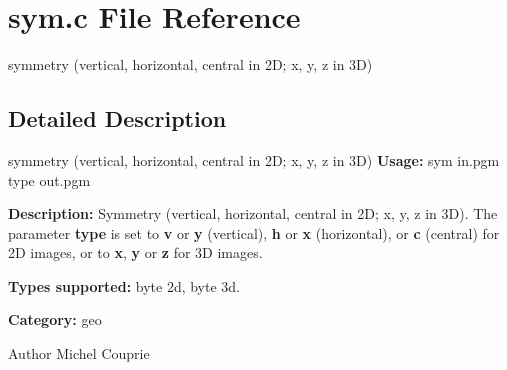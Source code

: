\section{sym.c File Reference}
\label{sym_8c}


symmetry (vertical, horizontal, central in 2D; x, y, z in 3D)  




\subsection{Detailed Description}
symmetry (vertical, horizontal, central in 2D; x, y, z in 3D) {\bfseries Usage:} sym in.pgm type out.pgm

{\bfseries Description:} Symmetry (vertical, horizontal, central in 2D; x, y, z in 3D). The parameter {\bfseries type} is set to {\bfseries v} or {\bfseries y} (vertical), {\bfseries h} or {\bfseries x} (horizontal), or {\bfseries c} (central) for 2D images, or to {\bfseries x}, {\bfseries y} or {\bfseries z} for 3D images.

{\bfseries Types supported:} byte 2d, byte 3d.

{\bfseries Category:} geo

\begin{DoxyAuthor}{Author}
Michel Couprie 
\end{DoxyAuthor}

